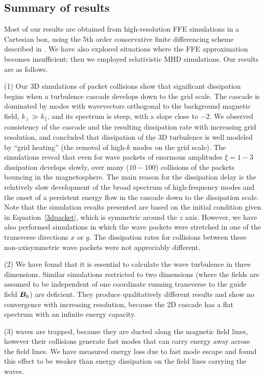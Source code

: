 \subsection{Summary of results}


Most of our results are obtained from high-resolution FFE simulations in a Cartesian box, using the 5th order conservative finite differencing scheme described in \cite{2011MNRAS.411.2461Y}. 
We have also explored situations where the FFE approximation becomes insufficient; then we employed relativistic MHD simulations. Our results are as follows.

(1) Our 3D simulations of packet collisions show that significant dissipation begins when a turbulence cascade develops down to the grid scale. 
The cascade is dominated by modes with wavevectors orthogonal to the background magnetic field, $k_\perp\gg k_\parallel$, and its
spectrum is steep, with a slope close to $-2$. We observed consistency of the cascade and the resulting dissipation rate with increasing grid resolution, and concluded that dissipation of the 3D turbulence is well modeled by ``grid heating'' (the removal of high-$k$ modes on the grid scale). 
The simulations reveal that even for wave packets of enormous amplitudes $\xi=1-3$ dissipation develops slowly, over many ($10-100$) collisions of the packets bouncing in the magnetosphere. The main reason for the dissipation delay is the relatively slow development of the broad spectrum of high-frequency modes and the onset of a persistent energy flow in the cascade down to the dissipation scale. Note that the simulation results presented are based on the initial condition given in Equation~\ref{3dpacket}, which is symmetric around the $z$ axis. However, we have also performed simulations in which the wave packets were stretched in one of the transverse directions $x$ or $y$. The dissipation rates for collisions between these non-axisymmetric wave packets were not appreciably different.

(2) We have found that it is essential to calculate the wave turbulence in three dimensions. Similar simulations restricted to two dimensions (where the fields are assumed to be independent of one  coordinate running transverse to the guide field $\boldsymbol{B}_0$) are deficient. They produce qualitatively different results and show no convergence with increasing resolution, because the 2D cascade has a flat spectrum with an infinite energy capacity.

(3) \alfven waves are trapped, because they are ducted along the magnetic field lines, however their collisions generate fast modes that can carry energy away across the field lines. We have measured energy loss due to fast mode escape and found this effect to be weaker than energy dissipation on the field lines carrying the \alfven waves.

